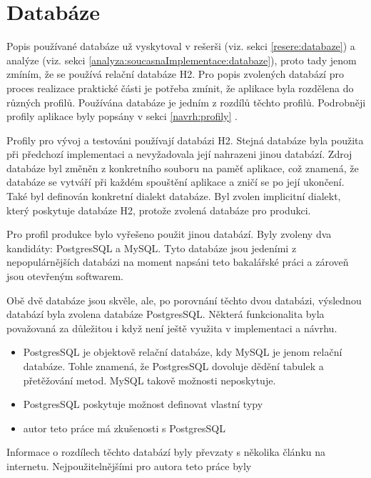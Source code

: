 \section{Databáze} \label{navrh:db}
    Popis používané databáze už vyskytoval v rešerši (viz. sekci \ref{resere:databaze}) a analýze (viz. sekci \ref{analyza:soucasnaImplementace:databaze}), proto tady jenom zmíním, že se používá relační databáze H2. Pro popis zvolených databází pro proces realizace praktické části je potřeba zmínit, že aplikace byla rozdělena do různých profilů. Používána databáze je jedním z rozdílů těchto profilů. Podrobněji profily aplikace byly popsány v sekci \ref{navrh:profily} .
    
    Profily pro vývoj a testováni používají databázi H2. Stejná databáze byla použita při předchozí implementaci a nevyžadovala její nahrazeni jinou databází. Zdroj databáze byl změněn z konkretního souboru na paměť aplikace, což znamená, že databáze se vytváří při každém spouštění aplikace a zničí se po její ukončení. Také byl definován konkretní dialekt databáze. Byl zvolen implicitní dialekt, který poskytuje databáze H2, protože zvolená databáze pro produkci.
    
    Pro profil produkce bylo vyřešeno použit jinou databází. Byly zvoleny dva kandidáty: PostgresSQL a MySQL. Tyto databáze jsou jedeními z nepopulárnějších databázi na moment napsáni teto bakalářské práci a zároveň jsou otevřeným softwarem.
    
    Obě dvě databáze jsou skvěle, ale, po porovnání těchto dvou databázi, výslednou databází byla zvolena databáze PostgresSQL. Některá funkcionalita byla považovaná za důležitou i když není ještě využita v implementaci a návrhu.
    \begin{itemize}
            \item PostgresSQL je objektově relační databáze\cite{postgres-about}, kdy MySQL je jenom relační databáze\cite{mysql-wiki}. Tohle znamená, že PostgresSQL dovoluje dědění tabulek a přetěžování metod. MySQL takově možnosti neposkytuje.
            \item PostgresSQL poskytuje možnost definovat vlastní typy\cite{pstgres-create-type}
            \item autor teto práce má zkušenosti s PostgresSQL
    \end{itemize}
    Informace o rozdílech těchto databází byly převzaty s několika článku na internetu. Nejpoužitelnějšími pro autora teto práce byly \cite{mysql-postgres1, mysql-postgres2}
    
